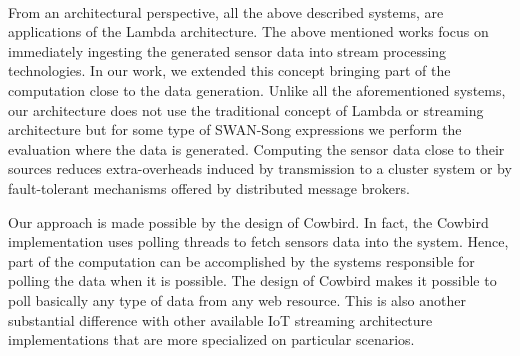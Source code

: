 \paragraph{}
From an architectural perspective, all the above described systems, are applications of the Lambda architecture. The above mentioned works focus on immediately ingesting the generated sensor data into stream processing technologies. In our work, we extended this concept bringing part of the computation close to the data generation. Unlike all the aforementioned systems, our architecture does not use the traditional concept of Lambda or streaming architecture but for some type of SWAN-Song expressions we perform the evaluation where the data is generated. Computing the sensor data close to their sources reduces extra-overheads induced by transmission to a cluster system or by fault-tolerant mechanisms offered by distributed message brokers. 

Our approach is made possible by the design of Cowbird. In fact, the Cowbird implementation uses polling threads to fetch sensors data into the system. Hence, part of the computation can be accomplished by the systems responsible for polling the data when it is possible. The design of Cowbird makes it possible to poll basically any type of data from any web resource. This is also another substantial difference with other available IoT streaming architecture implementations that are more specialized on particular scenarios.





